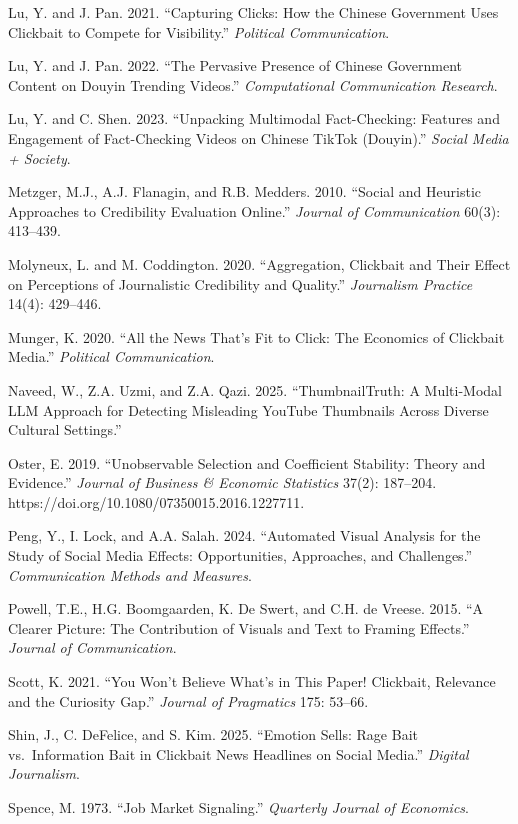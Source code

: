 \documentclass[
  12pt,
]{article}
\begin{document}
Lu, Y. and J. Pan. 2021. ``Capturing Clicks: How the Chinese Government
Uses Clickbait to Compete for Visibility.'' \emph{Political
Communication}.

Lu, Y. and J. Pan. 2022. ``The Pervasive Presence of Chinese Government
Content on Douyin Trending Videos.'' \emph{Computational Communication
Research}.

Lu, Y. and C. Shen. 2023. ``Unpacking Multimodal Fact-Checking: Features
and Engagement of Fact-Checking Videos on Chinese TikTok (Douyin).''
\emph{Social Media + Society}.

Metzger, M.J., A.J. Flanagin, and R.B. Medders. 2010. ``Social and
Heuristic Approaches to Credibility Evaluation Online.'' \emph{Journal
of Communication} 60(3): 413--439.

Molyneux, L. and M. Coddington. 2020. ``Aggregation, Clickbait and Their
Effect on Perceptions of Journalistic Credibility and Quality.''
\emph{Journalism Practice} 14(4): 429--446.

Munger, K. 2020. ``All the News That's Fit to Click: The Economics of
Clickbait Media.'' \emph{Political Communication}.

Naveed, W., Z.A. Uzmi, and Z.A. Qazi. 2025. ``ThumbnailTruth: A
Multi-Modal LLM Approach for Detecting Misleading YouTube Thumbnails
Across Diverse Cultural Settings.''

Oster, E. 2019. ``Unobservable Selection and Coefficient Stability:
Theory and Evidence.'' \emph{Journal of Business \& Economic Statistics}
37(2): 187--204. https://doi.org/10.1080/07350015.2016.1227711.

Peng, Y., I. Lock, and A.A. Salah. 2024. ``Automated Visual Analysis for
the Study of Social Media Effects: Opportunities, Approaches, and
Challenges.'' \emph{Communication Methods and Measures}.

Powell, T.E., H.G. Boomgaarden, K. De Swert, and C.H. de Vreese. 2015.
``A Clearer Picture: The Contribution of Visuals and Text to Framing
Effects.'' \emph{Journal of Communication}.

Scott, K. 2021. ``You Won't Believe What's in This Paper! Clickbait,
Relevance and the Curiosity Gap.'' \emph{Journal of Pragmatics} 175:
53--66.

Shin, J., C. DeFelice, and S. Kim. 2025. ``Emotion Sells: Rage Bait
vs.~Information Bait in Clickbait News Headlines on Social Media.''
\emph{Digital Journalism}.

Spence, M. 1973. ``Job Market Signaling.'' \emph{Quarterly Journal of
Economics}.
\end{document}
